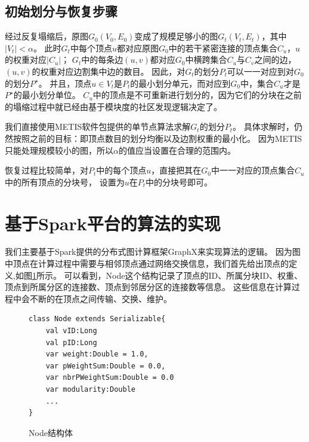 \documentclass[master]{njuthesis}
\begin{document}
\subsection{初始划分与恢复步骤}
经过反复塌缩后，原图$G_0(V_0,E_0)$变成了规模足够小的图$G_t(V_t,E_t)$，其中$|V_t| < \alpha$。
此时$G_t$中每个顶点$u$都对应原图$G_0$中的若干紧密连接的顶点集合$C_u$，$u$的权重对应$|C_u|$；
$G_t$中的每条边$(u,v)$都对应$G_0$中横跨集合$C_u$与$C_v$之间的边，$(u,v)$的权重对应边割集中边的数目。
因此，对$G_t$的划分$P_t$可以一一对应到对$G_0$的划分$P^\star$。
并且，顶点$u \in V_t$是$P_t$的最小划分单元，而对应到$G_0$中，集合$C_u$才是$P^\star$的最小划分单位。
$C_u$中的顶点是不可重新进行划分的，因为它们的分块在之前的塌缩过程中就已经由基于模块度的社区发现逻辑决定了。

我们直接使用METIS软件包提供的单节点算法求解$G_t$的划分$P_t$。
具体求解时，仍然按照之前的目标：即顶点数目的划分均衡以及边割权重的最小化。
因为METIS只能处理规模较小的图，所以$\alpha$的值应当设置在合理的范围内。

恢复过程比较简单，对$P_t$中的每个顶点$u$，直接把其在$G_0$中一一对应的顶点集合$C_u$中的所有顶点的分块号，
设置为$u$在$P_t$中的分块号即可。

\section{基于Spark平台的算法的实现}
我们主要基于Spark提供的分布式图计算框架GraphX来实现算法的逻辑。
因为图中顶点在计算过程中需要与相邻顶点通过网络交换信息，我们首先给出顶点的定义,如图\ref{fig:node_struct}所示。
可以看到，Node这个结构记录了顶点的ID、所属分块ID、权重、顶点到所属分区的连接数、顶点到邻居分区的连接数等信息。
这些信息在计算过程中会不断的在顶点之间传输、交换、维护。
\begin{figure}[h]
  \centering
\begin{lstlisting}
class Node extends Serializable{
    val vID:Long
    val pID:Long
    var weight:Double = 1.0,
    var pWeightSum:Double = 0.0,
    var nbrPWeightSum:Double = 0.0
    var modularity:Double
    ...
}
\end{lstlisting}
  \caption{Node结构体}
   \label{fig:node_struct}
\end{figure}
\end{document}
